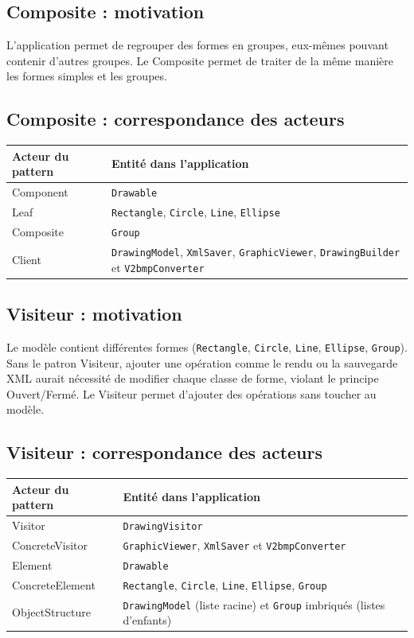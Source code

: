 \documentclass[11pt,a4paper]{article}
\begin{document}
\subsection{Composite : motivation}

L'application permet de regrouper des formes en groupes, eux-mêmes pouvant contenir d'autres groupes. Le Composite permet de traiter de la même manière les formes simples et les groupes.

\subsection{Composite : correspondance des acteurs}

\begin{tabular}{|>{\raggedright\arraybackslash}p{}|p{}|}
\hline
\textbf{Acteur du pattern} & \textbf{Entité dans l'application} \\
\hline
Component & \texttt{Drawable} \\
\hline
Leaf & \texttt{Rectangle}, \texttt{Circle}, \texttt{Line}, \texttt{Ellipse} \\
\hline
Composite & \texttt{Group} \\
\hline
Client & \texttt{DrawingModel}, \texttt{XmlSaver}, \texttt{GraphicViewer}, \texttt{DrawingBuilder} et \texttt{V2bmpConverter} \\
\hline
\end{tabular}

\subsection{Visiteur : motivation}

Le modèle contient différentes formes (\texttt{Rectangle}, \texttt{Circle}, \texttt{Line}, \texttt{Ellipse}, \texttt{Group}). Sans le patron Visiteur, ajouter une opération comme le rendu ou la sauvegarde XML aurait nécessité de modifier chaque classe de forme, violant le principe Ouvert/Fermé. Le Visiteur permet d'ajouter des opérations sans toucher au modèle.

\subsection{Visiteur : correspondance des acteurs}

\begin{tabular}{|>{\raggedright\arraybackslash}p{}|p{}|}
\hline
\textbf{Acteur du pattern} & \textbf{Entité dans l'application} \\
\hline
Visitor & \texttt{DrawingVisitor} \\
\hline
ConcreteVisitor & \texttt{GraphicViewer}, \texttt{XmlSaver} et \texttt{V2bmpConverter} \\
\hline
Element & \texttt{Drawable} \\
\hline
ConcreteElement & \texttt{Rectangle}, \texttt{Circle}, \texttt{Line}, \texttt{Ellipse}, \texttt{Group} \\
\hline
ObjectStructure & \texttt{DrawingModel} (liste racine) et \texttt{Group} imbriqués (listes d’enfants)\\
\hline
\end{tabular}
\end{document}
